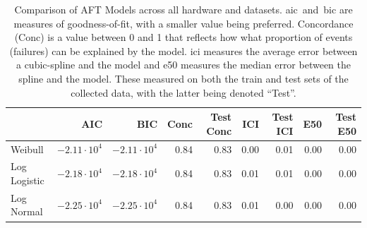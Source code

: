 \documentclass[sn-mathphys-num]{sn-jnl}%
\begin{document}
\begin{table}
\centering
\caption{Comparison of AFT Models across all hardware and datasets. \acrshort{aic}~and~\acrshort{bic} are measures of goodness-of-fit, with a smaller value being preferred. Concordance (Conc) is a value between 0 and 1 that reflects how what proportion of events (failures) can be explained by the model. \acrshort{ici} measures the average error between a cubic-spline and the model and \acrshort{e50} measures the median error between the spline and the model. These measured on both the train and test sets of the collected data, with the latter being denoted ``Test''.}
\label{tab:aft_summary}
\begin{tabular}{lrrrrrrrr}
\toprule
             & AIC              & BIC & Conc & Test Conc & ICI & Test ICI & E50 & Test E50 \\
\midrule
Weibull      & $-2.11\cdot10^4$ & $-2.11\cdot10^4$ & 0.84 & 0.83 & 0.00 & 0.01 & 0.00 & 0.00 \\
Log Logistic & $-2.18\cdot10^4$ & $-2.18\cdot10^4$ & 0.84 & 0.83 & 0.01 & 0.01 & 0.00 & 0.00 \\
Log Normal   & $-2.25\cdot10^4$ & $-2.25\cdot10^4$ & 0.84 & 0.83 & 0.01 & 0.00 & 0.00 & 0.00 \\
\bottomrule
\end{tabular}
\end{table}
\end{document}
